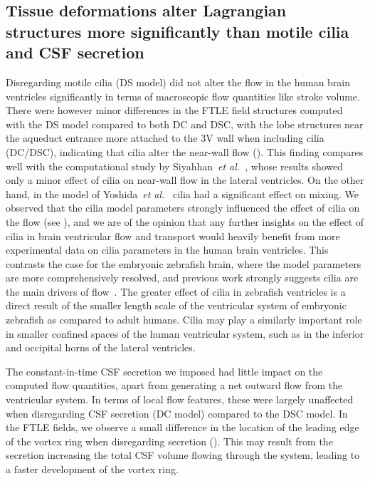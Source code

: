 \documentclass{template}
\begin{document}
\subsection{Tissue deformations alter Lagrangian structures more significantly
than motile cilia and CSF secretion}
Disregarding motile cilia (DS model) did not alter the flow in the human brain ventricles significantly
in terms of macroscopic flow quantities like stroke volume. 
There were however minor differences in the FTLE field structures computed with the DS model compared
to both DC and DSC, with the lobe structures near the aqueduct
entrance more attached to the 3V wall when including cilia (DC/DSC),
indicating that cilia alter the near-wall flow ().
This finding compares well with the computational study
by Siyahhan~\emph{et al.}~\citep{Siyahhan2014FlowVentricles},
whose results showed only a minor effect of cilia on near-wall flow in the lateral
ventricles. On the other hand, in the model of Yoshida~\emph{et al.}~\citep{Yoshida2022EffectVentricles} 
cilia had a significant effect on mixing. We observed that the cilia model parameters
strongly influenced the effect of cilia on the flow (see ),
and we are of the opinion that any further insights on the effect of cilia in
brain ventricular flow and transport would heavily benefit from more experimental data
on cilia parameters in the human brain ventricles.
This contrasts the case for the embryonic zebrafish brain, where the model parameters
are more comprehensively resolved, and previous work strongly suggests cilia are
the main drivers of flow~\citep{Olstad2019CiliaryDevelopment, Herlyng2025AdvectionDiffusion}.
The greater effect of cilia in zebrafish ventricles is a direct result of the smaller
length scale of the ventricular system of embryonic zebrafish
as compared to adult humans. Cilia may play a similarly important
role in smaller confined spaces of the human ventricular system,
such as in the inferior and occipital horns of the lateral ventricles.

The constant-in-time CSF secretion we imposed had little impact on the
computed flow quantities, apart from generating a net outward flow from the
ventricular system. In terms of local flow features,
these were largely unaffected when disregarding CSF secretion (DC model)
compared to the DSC model. In the FTLE fields, we observe a small
difference in the location of the leading edge of the vortex ring
when disregarding secretion ().
This may result from the secretion increasing the total CSF volume
flowing through the system, leading to a faster development of the vortex ring.
\end{document}
